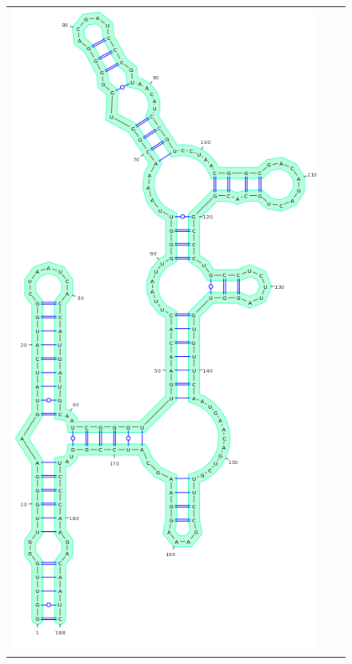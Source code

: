 \documentclass[11pt]{article} %
\begin{document}
{\begin{figure}
{\begin{adjustbox}{max width=\textwidth,max height=\textheight,keepaspectratio}
\begin{tabular}{@{}ccc@{}}
 \includegraphics[scale=\MyScale]{graphs/Supp_structures/1M7ILU_NMIAMg}& 

\end{tabular}
\end{adjustbox}}
\end{figure}}
\end{document}
